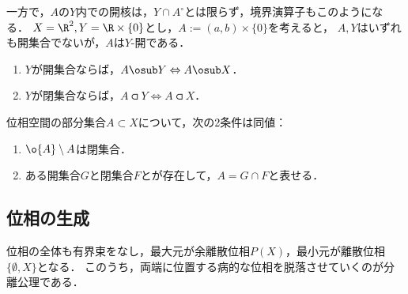 \documentclass[uplatex,dvipdfmx]{jsreport}
\begin{document}
\begin{example}[開集合についてはどちらの方向も成り立たない]
    一方で，$A$の$Y$内での開核は，$Y\cap A^\circ$とは限らず，境界演算子もこのようになる．
    $X=\R^2,Y=\R\times\{0\}$とし，$A:=(a,b)\times\{0\}$を考えると，
    $A,Y$はいずれも開集合でないが，$A$は$Y$-開である．
\end{example}

\begin{proposition}\mbox{}
    \begin{enumerate}
        \item $Y$が開集合ならば，$A\osub Y\Leftrightarrow A\osub X$．
        \item $Y$が閉集合ならば，$A\csub Y\Leftrightarrow A\csub X$．
    \end{enumerate}
\end{proposition}

\begin{proposition}
    位相空間の部分集合$A\subset X$について，次の2条件は同値：
    \begin{enumerate}
        \item $\o{A}\setminus A$は閉集合．
        \item ある開集合$G$と閉集合$F$とが存在して，$A=G\cap F$と表せる．
    \end{enumerate}
\end{proposition}

\subsection{位相の生成}

\begin{tcolorbox}[colframe=ForestGreen, colback=ForestGreen!10!white,breakable,colbacktitle=ForestGreen!40!white,coltitle=black,fonttitle=\bfseries\sffamily,
    title=]
    位相の全体も有界束をなし，最大元が余離散位相$P(X)$，最小元が離散位相$\{\emptyset,X\}$となる．
    このうち，両端に位置する病的な位相を脱落させていくのが分離公理である．
\end{tcolorbox}
\end{document}
